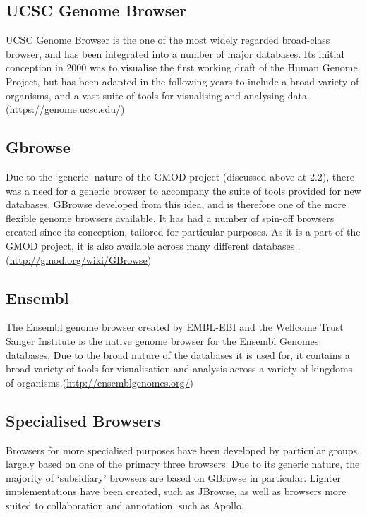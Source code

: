 \subsection{UCSC Genome Browser}
UCSC Genome Browser is the one of the most widely regarded broad-class browser, and has been integrated into a number of
major databases. Its initial conception in 2000 was to visualise the first working draft of the Human Genome Project, but has been adapted in the following years to include a broad variety of organisms, and a vast suite of tools for visualising and analysing data.(\url{https://genome.ucsc.edu/})

\subsection{Gbrowse} 
Due to the ‘generic’ nature of the GMOD project (discussed above at 2.2), there was a need for a generic browser to accompany the suite of tools provided for new databases. GBrowse developed from this idea, and is therefore one of the more flexible genome browsers available. It has had a number of spin-off browsers created since its conception, tailored for particular purposes. As it is a part of the GMOD project, it is also available across many different databases \cite{ranganathan2018encyclopedia}. (\url{http://gmod.org/wiki/GBrowse})

\subsection{Ensembl} 
The Ensembl genome browser created by EMBL-EBI and the Wellcome Trust Sanger Institute is the native genome browser for the
Ensembl Genomes databases. Due to the broad nature of the databases it is used for, it contains a broad variety of tools for visualisation and analysis across a variety of kingdoms of organisms.(\url{http://ensemblgenomes.org/})

\subsection{Specialised Browsers}
Browsers for more specialised purposes have been developed by particular groups, largely based on one of the primary three
browsers. Due to its generic nature, the majority of ‘subsidiary’ browsers are based on GBrowse in particular. Lighter implementations have been created, such as JBrowse, as well as browsers more suited to collaboration and annotation, such as Apollo.


